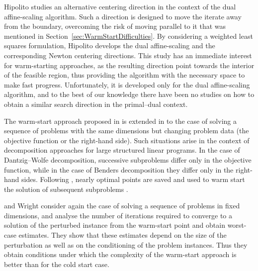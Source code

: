{Hipolito \cite{Hipolito} studies an alternative centering direction 
in the context of the dual affine-scaling algorithm. Such a 
direction is designed to move the iterate away from the boundary, 
overcoming the risk of moving parallel to it that was mentioned 
in Section~\ref{sec:WarmStartDifficulties}. 
By considering a weighted least squares formulation, Hipolito 
develops the dual affine-scaling and the corresponding Newton 
centering directions. 
This study has an immediate interest for warm-starting approaches,
as the resulting direction point towards the interior of the 
feasible region, thus providing the algorithm with the necessary 
space to make fast progress. 
Unfortunately, it is developed only for the dual affine-scaling 
algorithm, and to the best of our knowledge there have been no 
studies on how to obtain a similar search direction in the 
primal--dual context.

The warm-start approach proposed in \cite{Gondzio98} is extended
in \cite{GondzioVial} to the case of solving a sequence of problems 
with the same dimensions but changing problem data (the objective 
function or the right-hand side). Such situations arise 
in the context of decomposition approaches for large structured 
linear programs. 
In the case of Dantzig--Wolfe decomposition, successive subproblems 
differ only in the objective function, while in the case 
of Benders decomposition they differ only in the right-hand sides.
Following \cite{Gondzio98}, nearly optimal points are saved and used 
to warm start the solution of subsequent subproblems \cite{GondzioVial}.


\yildirim and Wright \cite{YildirimWright} consider again the case 
of solving a sequence of problems in fixed dimensions, and
analyse the number of iterations required to converge to a 
solution of the perturbed instance from the warm-start point and 
obtain worst-case estimates.
They show that these estimates depend on the size of the perturbation 
as well as on the conditioning %
of the problem 
instances. Thus they obtain conditions under which the complexity 
of the warm-start approach is better than for the cold start case.

}
